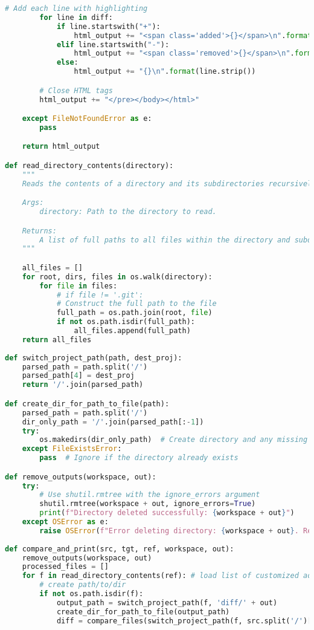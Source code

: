 \begin{lstlisting}[language=python]
        # Add each line with highlighting
        for line in diff:
            if line.startswith("+"):
                html_output += "<span class='added'>{}</span>\n".format(line.strip())
            elif line.startswith("-"):
                html_output += "<span class='removed'>{}</span>\n".format(line.strip())
            else:
                html_output += "{}\n".format(line.strip())

        # Close HTML tags
        html_output += "</pre></body></html>"

    except FileNotFoundError as e:
        pass

    return html_output

def read_directory_contents(directory):
    """
    Reads the contents of a directory and its subdirectories recursively.

    Args:
        directory: Path to the directory to read.

    Returns:
        A list of full paths to all files within the directory and subdirectories.
    """

    all_files = []
    for root, dirs, files in os.walk(directory):
        for file in files:
            # if file != '.git':
            # Construct the full path to the file
            full_path = os.path.join(root, file)
            if not os.path.isdir(full_path):
                all_files.append(full_path)
    return all_files
    
def switch_project_path(path, dest_proj):
    parsed_path = path.split('/')
    parsed_path[4] = dest_proj
    return '/'.join(parsed_path)

def create_dir_for_path_to_file(path):
    parsed_path = path.split('/')
    dir_only_path = '/'.join(parsed_path[:-1])
    try:
        os.makedirs(dir_only_path)  # Create directory and any missing parent directories
    except FileExistsError:
        pass  # Ignore if the directory already exists

def remove_outputs(workspace, out):
    try:
        # Use shutil.rmtree with the ignore_errors argument
        shutil.rmtree(workspace + out, ignore_errors=True)
        print(f"Directory deleted successfully: {workspace + out}")
    except OSError as e:
        raise OSError(f"Error deleting directory: {workspace + out}. Reason: {e}") from e
    
def compare_and_print(src, tgt, ref, workspace, out):
    remove_outputs(workspace, out)
    processed_files = []
    for f in read_directory_contents(ref): # load list of customized aosp files
        # create path/to/dir
        if not os.path.isdir(f):
            output_path = switch_project_path(f, 'diff/' + out)
            create_dir_for_path_to_file(output_path)
            diff = compare_files(switch_project_path(f, src.split('/')[4]), switch_project_path(f, tgt.split('/')[4]), out)
            

\end{lstlisting}

